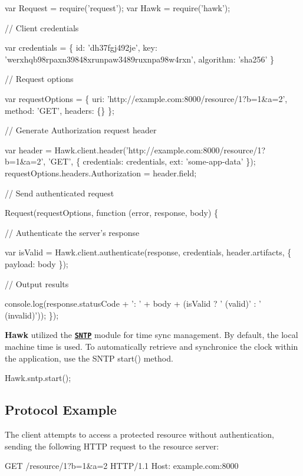 \begin{DoxyCode}
var Request = require('request');
var Hawk = require('hawk');


// Client credentials

var credentials = \{
    id: 'dh37fgj492je',
    key: 'werxhqb98rpaxn39848xrunpaw3489ruxnpa98w4rxn',
    algorithm: 'sha256'
\}

// Request options

var requestOptions = \{
    uri: 'http://example.com:8000/resource/1?b=1&a=2',
    method: 'GET',
    headers: \{\}
\};

// Generate Authorization request header

var header = Hawk.client.header('http://example.com:8000/resource/1?b=1&a=2', 'GET', \{ credentials:
       credentials, ext: 'some-app-data' \});
requestOptions.headers.Authorization = header.field;

// Send authenticated request

Request(requestOptions, function (error, response, body) \{

    // Authenticate the server's response

    var isValid = Hawk.client.authenticate(response, credentials, header.artifacts, \{ payload: body \});

    // Output results

    console.log(response.statusCode + ': ' + body + (isValid ? ' (valid)' : ' (invalid)'));
\});
\end{DoxyCode}


{\bfseries Hawk} utilized the \href{https://github.com/hueniverse/sntp}{\tt {\bfseries S\+N\+TP}} module for time sync management. By default, the local machine time is used. To automatically retrieve and synchronice the clock within the application, use the S\+N\+TP \textquotesingle{}start()\textquotesingle{} method.


\begin{DoxyCode}
Hawk.sntp.start();
\end{DoxyCode}


\subsection*{Protocol Example}

The client attempts to access a protected resource without authentication, sending the following H\+T\+TP request to the resource server\+:


\begin{DoxyCode}
GET /resource/1?b=1&a=2 HTTP/1.1
Host: example.com:8000
\end{DoxyCode}


